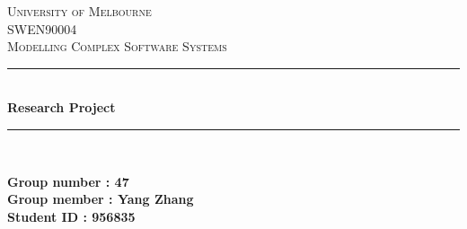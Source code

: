 \begin{titlepage}

\newcommand{\HRule}{\rule{\linewidth}{0.5mm}} %

\center %
 

\textsc{\LARGE University of Melbourne}\\[1.5cm] %
\textsc{\Large SWEN90004}\\[0.5cm] %
\textsc{\large Modelling Complex Software Systems}\\[0.5cm] %


\HRule \\[0.4cm]
{ \huge \bfseries Research Project}\\[0.4cm] %
\HRule \\[1.5cm]


\begin{minipage}{0.4\textwidth}
	\bfseries Group number : 47\\
	\bfseries Group member : Yang Zhang\\
	\bfseries Student ID : 956835
\end{minipage}\\[2cm]




\end{titlepage}
